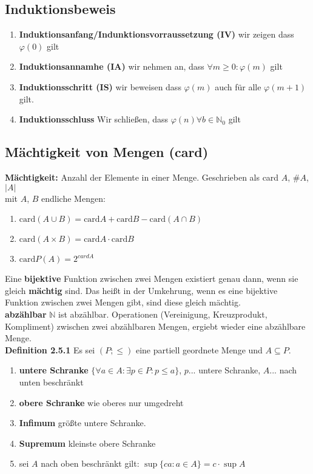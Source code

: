 
\subsection{Induktionsbeweis}

\begin{enumerate}
    \item \textbf{Induktionsanfang/Indunktionsvorraussetzung (IV)} wir zeigen dass $\varphi (0)$ gilt
    \item \textbf{Induktionsannamhe (IA)} wir nehmen an, dass $\forall m \geq 0 :\varphi (m)$ gilt
    \item \textbf{Induktionsschritt (IS)} wir beweisen dass $\varphi (m)$ auch für alle $\varphi (m+1)$ gilt.
    \item \textbf{Induktionsschluss} Wir schließen, dass $\varphi (n) \forall b\in \mathbb{N}_0$ gilt
\end{enumerate}

\subsection{Mächtigkeit von Mengen (card)}

\textbf{Mächtigkeit:} Anzahl der Elemente in einer Menge. Geschrieben als card $A$, $\# A$, $|A|$\\

mit $A$, $B$ endliche Mengen:
\begin{enumerate}
    \item $\text{card} (A\cup B) = \text{card} A + \text{card} B - \text{card} (A\cap B)$
    \item $\text{card} (A\times B) = \text{card} A \cdot \text{card} B$
    \item $\text{card} P(A) = 2^{card A}$
\end{enumerate}

Eine \textbf{bijektive} Funktion zwischen zwei Mengen existiert genau dann, wenn sie gleich \textbf{mächtig} sind. Das heißt in der Umkehrung, wenn es eine bijektive Funktion zwischen zwei Mengen gibt, sind diese gleich mächtig.\\

\textbf{abzählbar} $\mathbb{N}$ ist abzählbar. Operationen (Vereinigung, Kreuzprodukt, Kompliment) zwischen zwei abzählbaren Mengen, ergiebt wieder eine abzählbare Menge.\\

\textbf{Definition 2.5.1} Es sei $(P;\leq )$ eine partiell geordnete Menge und $A\subseteq P$.
\begin{enumerate}
    \item \textbf{untere Schranke} $\{\forall a \in A :\exists p\in P:p\leq a\}$, $p$... untere Schranke, $A$... nach unten beschränkt
    \item \textbf{obere Schranke} wie oberes nur umgedreht
    \item \textbf{Infimum} größte untere Schranke.
    \item \textbf{Supremum} kleinste obere Schranke
    \item sei $A$ nach oben beschränkt gilt: $\sup \{ca:a\in A\} = c\cdot \sup A$
\end{enumerate}
